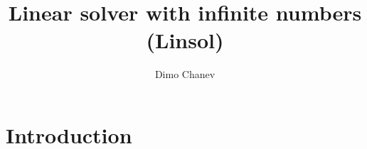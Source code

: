 \documentclass[]{article}
\title{Linear solver with infinite numbers (Linsol)}
\author{Dimo Chanev}
\begin{document}
	\maketitle
    \newpage

    \tableofcontents

    
    \newpage

	\section{Introduction}
\end{document}
